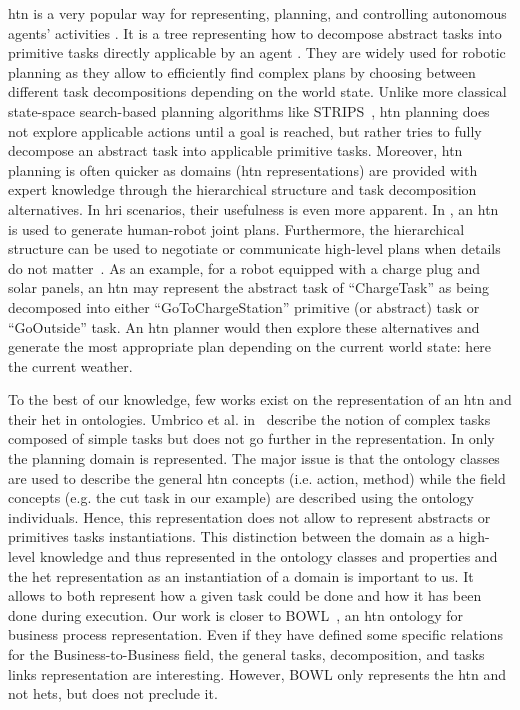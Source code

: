 \acrshort{htn} is a very popular way for representing, planning, and controlling autonomous agents' activities \cite{ghallab_2004_automated, ingrand_2017_deliberation}. It is a tree representing how to decompose abstract tasks into primitive tasks directly applicable by an agent \cite{erol_1994_htn}. They are widely used for robotic planning as they allow to efficiently find complex plans by choosing between different task decompositions depending on the world state. 
Unlike more classical state-space search-based planning algorithms like STRIPS~\cite{fikes_1971_strips}, \acrshort{htn} planning does not explore applicable actions until a goal is reached, but rather tries to fully decompose an abstract task into applicable primitive tasks. Moreover, \acrshort{htn} planning is often quicker as domains (\acrshort{htn} representations) are provided with expert knowledge through the hierarchical structure and task decomposition alternatives. 
In \acrshort{hri} scenarios, their usefulness is even more apparent. In \cite{lallement_2014_hatp}, an \acrshort{htn} is used to generate human-robot joint plans. Furthermore, the hierarchical structure can be used to negotiate or communicate high-level plans when details do not matter~\cite{milliez_2016_using}. As an example, for a robot equipped with a charge plug and solar panels, an \acrshort{htn} may represent the abstract task of ``ChargeTask'' as being decomposed into either ``GoToChargeStation'' primitive (or abstract) task or ``GoOutside'' task. An \acrshort{htn} planner would then explore these alternatives and generate the most appropriate plan depending on the current world state: here the current weather.

To the best of our knowledge, few works exist on the representation of an \acrshort{htn} and their \acrfull{het} in ontologies. Umbrico et al. in~\cite{umbrico_2020_ontology} describe the notion of complex tasks composed of simple tasks but does not go further in the representation. In \cite{freitas_2014_using} only the planning domain is represented. The major issue is that the ontology classes are used to describe the general \acrshort{htn} concepts (i.e. action, method) while the field concepts (e.g. the cut task in our example) are described using the ontology individuals. Hence, this representation does not allow to represent abstracts or primitives tasks instantiations. This distinction between the domain as a high-level knowledge and thus represented in the ontology classes and properties and the \acrshort{het} representation as an instantiation of a domain is important to us. It allows to both represent how a given task could be done and how it has been done during execution. Our work is closer to BOWL~\cite{ko_2011_business}, an \acrshort{htn} ontology for business process representation. Even if they have defined some specific relations for the Business-to-Business field, the general tasks, decomposition, and tasks links representation are interesting. However, BOWL only represents the \acrshort{htn} and not \acrshort{het}s, but does not preclude it.

